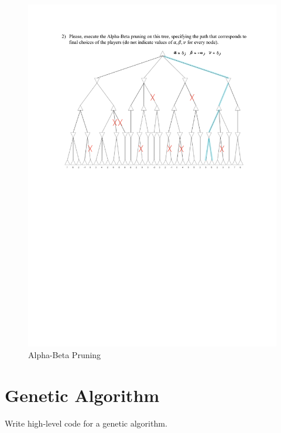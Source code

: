 \documentclass[a4paper,12pt]{article} %
\begin{document}
	\begin{figure}[htb]
		\centering
		\includegraphics[width=\linewidth]{alpha-beta.pdf}	
		\caption{Alpha-Beta Pruning}
		\label{fig:initial}
	\end{figure}
	
	\newpage
	\section{Genetic Algorithm}
	Write high-level code for a genetic algorithm.
	
\end{document}
